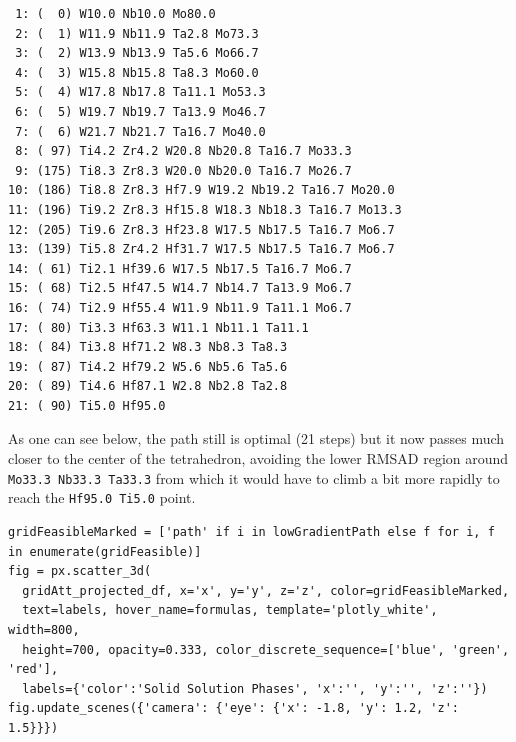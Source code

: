 \begin{verbatim}
 1: (  0) W10.0 Nb10.0 Mo80.0 
 2: (  1) W11.9 Nb11.9 Ta2.8 Mo73.3 
 3: (  2) W13.9 Nb13.9 Ta5.6 Mo66.7 
 4: (  3) W15.8 Nb15.8 Ta8.3 Mo60.0 
 5: (  4) W17.8 Nb17.8 Ta11.1 Mo53.3 
 6: (  5) W19.7 Nb19.7 Ta13.9 Mo46.7 
 7: (  6) W21.7 Nb21.7 Ta16.7 Mo40.0 
 8: ( 97) Ti4.2 Zr4.2 W20.8 Nb20.8 Ta16.7 Mo33.3 
 9: (175) Ti8.3 Zr8.3 W20.0 Nb20.0 Ta16.7 Mo26.7 
10: (186) Ti8.8 Zr8.3 Hf7.9 W19.2 Nb19.2 Ta16.7 Mo20.0 
11: (196) Ti9.2 Zr8.3 Hf15.8 W18.3 Nb18.3 Ta16.7 Mo13.3 
12: (205) Ti9.6 Zr8.3 Hf23.8 W17.5 Nb17.5 Ta16.7 Mo6.7 
13: (139) Ti5.8 Zr4.2 Hf31.7 W17.5 Nb17.5 Ta16.7 Mo6.7 
14: ( 61) Ti2.1 Hf39.6 W17.5 Nb17.5 Ta16.7 Mo6.7 
15: ( 68) Ti2.5 Hf47.5 W14.7 Nb14.7 Ta13.9 Mo6.7 
16: ( 74) Ti2.9 Hf55.4 W11.9 Nb11.9 Ta11.1 Mo6.7 
17: ( 80) Ti3.3 Hf63.3 W11.1 Nb11.1 Ta11.1 
18: ( 84) Ti3.8 Hf71.2 W8.3 Nb8.3 Ta8.3 
19: ( 87) Ti4.2 Hf79.2 W5.6 Nb5.6 Ta5.6 
20: ( 89) Ti4.6 Hf87.1 W2.8 Nb2.8 Ta2.8 
21: ( 90) Ti5.0 Hf95.0 
\end{verbatim}

As one can see below, the path still is optimal (21 steps) but it now
passes much closer to the center of the tetrahedron, avoiding the lower
RMSAD region around \texttt{Mo33.3 Nb33.3 Ta33.3} from
which it would have to climb a bit more rapidly to reach the
\texttt{Hf95.0 Ti5.0} point.

\begin{verbatim}
gridFeasibleMarked = ['path' if i in lowGradientPath else f for i, f in enumerate(gridFeasible)]
fig = px.scatter_3d(
  gridAtt_projected_df, x='x', y='y', z='z', color=gridFeasibleMarked, 
  text=labels, hover_name=formulas, template='plotly_white', width=800, 
  height=700, opacity=0.333, color_discrete_sequence=['blue', 'green', 'red'],
  labels={'color':'Solid Solution Phases', 'x':'', 'y':'', 'z':''})
fig.update_scenes({'camera': {'eye': {'x': -1.8, 'y': 1.2, 'z': 1.5}}})
\end{verbatim}

